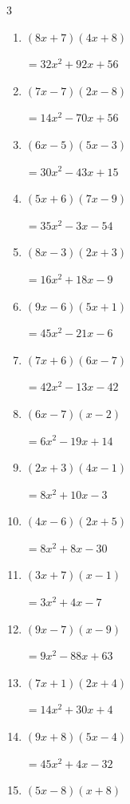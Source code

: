 \begin{multicols}{3}
\begin{enumerate}
        $=14x^{2}+6x-8$

\columnbreak %

  \item $(8x+7)(4x+8)$

        $=32x^{2}+92x+56$

  \item $(7x-7)(2x-8)$

        $=14x^{2}-70x+56$

  \item $(6x-5)(5x-3)$

        $=30x^{2}-43x+15$

  \item $(5x+6)(7x-9)$

        $=35x^{2}-3x-54$

  \item $(8x-3)(2x+3)$

        $=16x^{2}+18x-9$

  \item $(9x-6)(5x+1)$

        $=45x^{2}-21x-6$

  \item $(7x+6)(6x-7)$

        $=42x^{2}-13x-42$

  \item $(6x-7)(x-2)$

        $=6x^{2}-19x+14$

  \item $(2x+3)(4x-1)$

        $=8x^{2}+10x-3$

  \item $(4x-6)(2x+5)$

        $=8x^{2}+8x-30$

  \item $(3x+7)(x-1)$

        $=3x^{2}+4x-7$

  \item $(9x-7)(x-9)$

        $=9x^{2}-88x+63$

  \item $(7x+1)(2x+4)$

        $=14x^{2}+30x+4$

  \item $(9x+8)(5x-4)$

        $=45x^{2}+4x-32$

  \item $(5x-8)(x+8)$


\end{enumerate}
\end{multicols}
